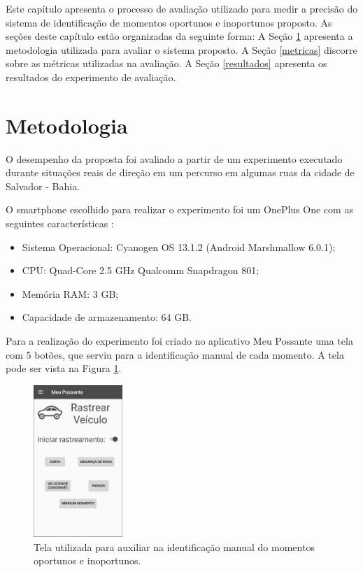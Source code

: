 \label{estudo-experimental}

Este capítulo apresenta o processo de avaliação utilizado para medir a precisão do
sistema de identificação de momentos oportunos e inoportunos proposto. As seções deste
capítulo estão organizadas da seguinte forma: A Seção \ref{metodologia} apresenta a metodologia
utilizada para avaliar o sistema proposto. A Seção \ref{metricas} discorre sobre as métricas
utilizadas na avaliação. A Seção \ref{resultados} apresenta os resultados do experimento de
avaliação.

\section{Metodologia}
\label{metodologia}

O desempenho da proposta foi avaliado a partir de um experimento executado durante
situações reais de direção em um percurso em algumas ruas da cidade de Salvador -
Bahia.

O smartphone escolhido para realizar o experimento foi um OnePlus One com as seguintes características
\cite{oneplusone}:

\begin{itemize}
  \item Sistema Operacional: Cyanogen OS 13.1.2 (Android Marshmallow 6.0.1);
  \item CPU: Quad-Core 2.5 GHz Qualcomm Snapdragon 801;
  \item Memória RAM: 3 GB;
  \item Capacidade de armazenamento: 64 GB.
\end{itemize}

Para a realização do experimento foi criado no aplicativo Meu Possante uma tela com 5 botões, que serviu
para a identificação manual de cada momento. A tela pode ser vista na Figura \ref{tela-experimento}.

\begin{figure}[h]
\centering
\includegraphics[width=0.3\textwidth]{images/tela-experimento.png}
\caption{Tela utilizada para auxiliar na identificação manual do momentos oportunos e inoportunos.}
\label{tela-experimento}
\end{figure}

